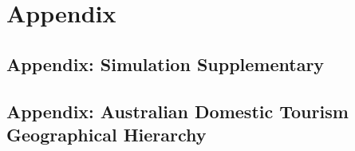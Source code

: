 \documentclass[
  11pt,
  letterpaper,
  DIV=11,
  numbers=noendperiod,
  titlepage]{scrartcl}
\begin{document}
\pagebreak

\section{Appendix}\label{sec-appendix}

\subsection{Appendix: Simulation
Supplementary}\label{sec-sim-supplement}

\subsection{Appendix: Australian Domestic Tourism Geographical
Hierarchy}\label{sec-tourism-supplement}

\begingroup\fontsize{8}{10}\selectfont
\end{document}

